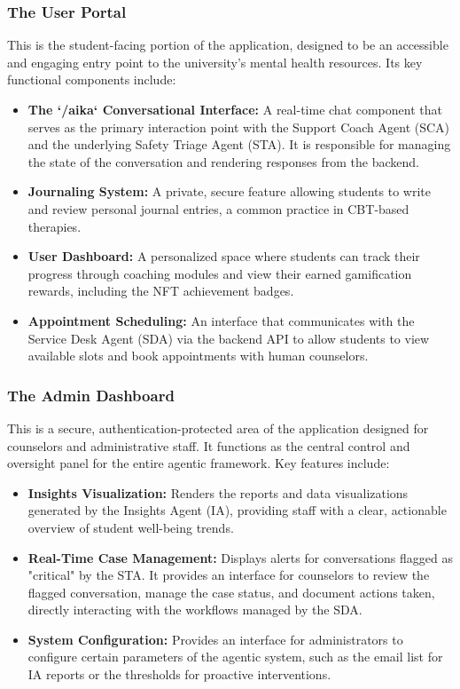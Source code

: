 \subsubsection{The User Portal}
This is the student-facing portion of the application, designed to be an accessible and engaging entry point to the university's mental health resources. Its key functional components include:
\begin{itemize}
    \item \textbf{The `/aika` Conversational Interface:} A real-time chat component that serves as the primary interaction point with the Support Coach Agent (SCA) and the underlying Safety Triage Agent (STA). It is responsible for managing the state of the conversation and rendering responses from the backend.
    \item \textbf{Journaling System:} A private, secure feature allowing students to write and review personal journal entries, a common practice in CBT-based therapies.
    \item \textbf{User Dashboard:} A personalized space where students can track their progress through coaching modules and view their earned gamification rewards, including the NFT achievement badges.
    \item \textbf{Appointment Scheduling:} An interface that communicates with the Service Desk Agent (SDA) via the backend API to allow students to view available slots and book appointments with human counselors.
\end{itemize}

\subsubsection{The Admin Dashboard}
This is a secure, authentication-protected area of the application designed for counselors and administrative staff. It functions as the central control and oversight panel for the entire agentic framework. Key features include:
\begin{itemize}
    \item \textbf{Insights Visualization:} Renders the reports and data visualizations generated by the Insights Agent (IA), providing staff with a clear, actionable overview of student well-being trends.
    \item \textbf{Real-Time Case Management:} Displays alerts for conversations flagged as "critical" by the STA. It provides an interface for counselors to review the flagged conversation, manage the case status, and document actions taken, directly interacting with the workflows managed by the SDA.
    \item \textbf{System Configuration:} Provides an interface for administrators to configure certain parameters of the agentic system, such as the email list for IA reports or the thresholds for proactive interventions.
\end{itemize}

